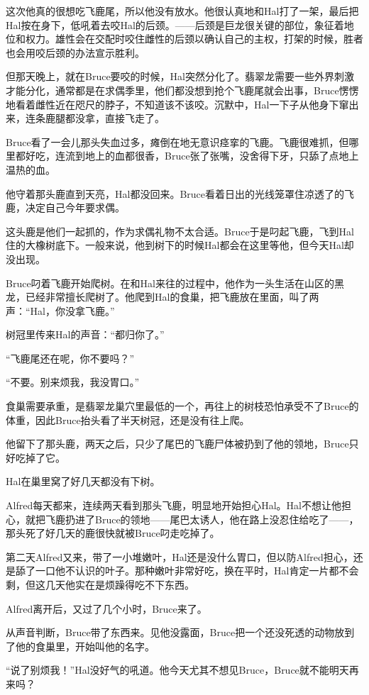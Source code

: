 \documentclass[../main.tex]{subfiles}
\begin{document}
这次他真的很想吃飞鹿尾，所以他没有放水。他很认真地和Hal打了一架，最后把Hal按在身下，低吼着去咬Hal的后颈。------后颈是巨龙很关键的部位，象征着地位和权力。雄性会在交配时咬住雌性的后颈以确认自己的主权，打架的时候，胜者也会用咬后颈的办法宣示胜利。

但那天晚上，就在Bruce要咬的时候，Hal突然分化了。翡翠龙需要一些外界刺激才能分化，通常都是在求偶季里，他们都没想到抢个飞鹿尾就会出事，Bruce愣愣地看着雌性近在咫尺的脖子，不知道该不该咬。沉默中，Hal一下子从他身下窜出来，连条鹿腿都没拿，直接飞走了。

Bruce看了一会儿那头失血过多，瘫倒在地无意识痉挛的飞鹿。飞鹿很难抓，但哪里都好吃，连流到地上的血都很香，Bruce张了张嘴，没舍得下牙，只舔了点地上温热的血。

他守着那头鹿直到天亮，Hal都没回来。Bruce看着日出的光线笼罩住凉透了的飞鹿，决定自己今年要求偶。

这头鹿是他们一起抓的，作为求偶礼物不太合适。Bruce于是叼起飞鹿，飞到Hal住的大橡树底下。一般来说，他到树下的时候Hal都会在这里等他，但今天Hal却没出现。

Bruce叼着飞鹿开始爬树。在和Hal来往的过程中，他作为一头生活在山区的黑龙，已经非常擅长爬树了。他爬到Hal的食巢，把飞鹿放在里面，叫了两声：``Hal，你没拿飞鹿。''

树冠里传来Hal的声音：``都归你了。''

``飞鹿尾还在呢，你不要吗？''

``不要。别来烦我，我没胃口。''

食巢需要承重，是翡翠龙巢穴里最低的一个，再往上的树枝恐怕承受不了Bruce的体重，因此Bruce抬头看了半天树冠，还是没有往上爬。

他留下了那头鹿，两天之后，只少了尾巴的飞鹿尸体被扔到了他的领地，Bruce只好吃掉了它。

Hal在巢里窝了好几天都没有下树。

Alfred每天都来，连续两天看到那头飞鹿，明显地开始担心Hal。Hal不想让他担心，就把飞鹿扔进了Bruce的领地------尾巴太诱人，他在路上没忍住给吃了------，那头死了好几天的鹿很快就被Bruce叼走吃掉了。

第二天Alfred又来，带了一小堆嫩叶，Hal还是没什么胃口，但以防Alfred担心，还是舔了一口他不认识的叶子。那种嫩叶非常好吃，换在平时，Hal肯定一片都不会剩，但这几天他实在是烦躁得吃不下东西。

Alfred离开后，又过了几个小时，Bruce来了。

从声音判断，Bruce带了东西来。见他没露面，Bruce把一个还没死透的动物放到了他的食巢里，开始叫他的名字。

``说了别烦我！''Hal没好气的吼道。他今天尤其不想见Bruce，Bruce就不能明天再来吗？
\end{document}

